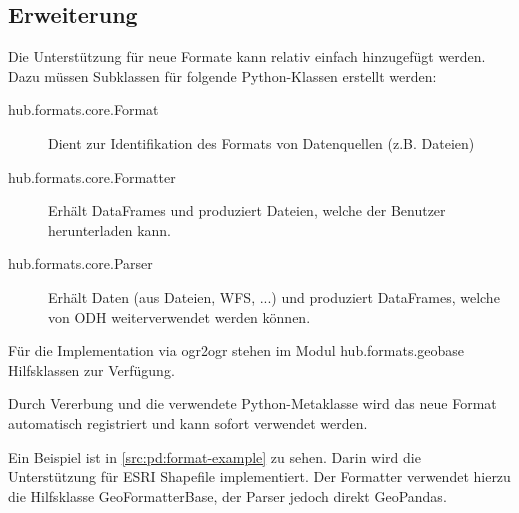 \subsection{Erweiterung}
Die Unterstützung für neue Formate kann relativ einfach hinzugefügt werden. Dazu müssen Subklassen für folgende Python-Klassen erstellt werden:

\begin{description}
\item[hub.formats.core.Format] Dient zur Identifikation des Formats von Datenquellen (z.B. Dateien)
\item[hub.formats.core.Formatter] Erhält DataFrames und produziert Dateien, welche der Benutzer herunterladen kann.
\item[hub.formats.core.Parser] Erhält Daten (aus Dateien, WFS, ...) und produziert DataFrames, welche von ODH weiterverwendet werden können.
\end{description}

Für die Implementation via ogr2ogr stehen im Modul hub.formats.geobase Hilfsklassen zur Verfügung.

Durch Vererbung und die verwendete Python-Metaklasse wird das neue Format automatisch registriert und kann sofort verwendet werden.

Ein Beispiel ist in \cref{src:pd:format-example} zu sehen. Darin wird die Unterstützung für ESRI Shapefile implementiert. Der Formatter verwendet hierzu die Hilfsklasse GeoFormatterBase, der Parser jedoch direkt GeoPandas.

